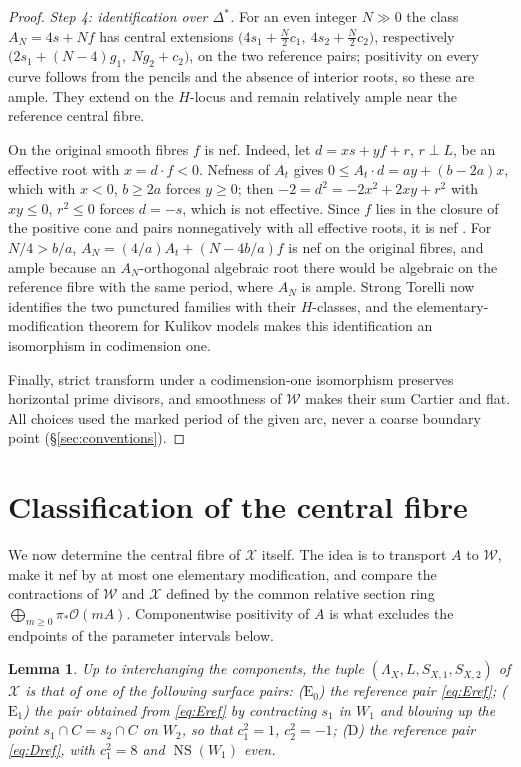 \documentclass[12pt]{article}
\newcommand{\NS}{\operatorname{NS}}
\newcommand{\calX}{\mathcal X}
\newcommand{\calW}{\mathcal W}
\newtheorem{lemma}[theorem]{Lemma}
\theoremstyle{definition}
\theoremstyle{remark}
\begin{document}
\begin{proof}
\emph{Step 4: identification over \(\Delta^*\).}
For an even integer \(N\gg0\) the class \(A_N=4s+Nf\) has central
extensions \(\bigl(4s_1+\tfrac N2c_1,\ 4s_2+\tfrac N2c_2\bigr)\),
respectively \(\bigl(2s_1+(N-4)g_1,\ Ng_2+c_2\bigr)\), on the two
reference pairs; positivity on every curve follows from the pencils
and the absence of interior roots, so these are ample. They extend on
the \(H\)-locus and remain relatively ample near the reference central
fibre.

On the original smooth fibres \(f\) is nef. Indeed, let
\(d=xs+yf+r\), \(r\perp L\), be an effective root with
\(x=d\cdot f<0\). Nefness of \(A_t\) gives
\(0\leq A_t\cdot d=ay+(b-2a)x\), which with \(x<0\), \(b\geq2a\)
forces \(y\geq0\); then \(-2=d^2=-2x^2+2xy+r^2\) with \(xy\leq0\),
\(r^2\leq0\) forces \(d=-s\), which is not effective. Since \(f\) lies
in the closure of the positive cone and pairs nonnegatively with all
effective roots, it is nef \cite[Ch.~8]{Hu}. For \(N/4>b/a\),
\(A_N=(4/a)A_t+(N-4b/a)f\) is nef on the original fibres, and ample
because an \(A_N\)-orthogonal algebraic root there would be algebraic
on the reference fibre with the same period, where \(A_N\) is ample.
Strong Torelli \cite[Theorem~2.3]{AE} now identifies the two punctured
families with their \(H\)-classes, and the elementary-modification
theorem for Kulikov models \cite[Corollary~3.1]{SB} makes this
identification an isomorphism in codimension one.

Finally, strict transform under a codimension-one isomorphism
preserves horizontal prime divisors, and smoothness of \(\calW\) makes
their sum Cartier and flat. All choices used the marked period of the
given arc, never a coarse boundary point (\S\ref{sec:conventions}).
\end{proof}

\section{Classification of the central fibre}\label{sec:models}

We now determine the central fibre of \(\calX\) itself. The idea is to
transport \(A\) to \(\calW\), make it nef by at most one elementary
modification, and compare the contractions of \(\calW\) and \(\calX\)
defined by the common relative section ring
\(\bigoplus_{m\ge0}\pi_*\mathcal O(mA)\). Componentwise positivity
of \(A\) is what excludes the endpoints of the parameter intervals
below.

\begin{lemma}\label{lem:models}
Up to interchanging the components, the tuple
\((\Lambda_X,L,S_{X,1},S_{X,2})\) of \(\calX\) is that of one of the
following surface pairs:
(\(\mathrm E_0\)) the reference pair \eqref{eq:Eref};
(\(\mathrm E_1\)) the pair obtained from \eqref{eq:Eref} by
contracting \(s_1\) in \(W_1\) and blowing up the point
\(s_1\cap C=s_2\cap C\) on \(W_2\), so that \(c_1^2=1\), \(c_2^2=-1\);
(\(\mathrm D\)) the reference pair \eqref{eq:Dref}, with
\(c_1^2=8\) and \(\NS(W_1)\) even.
\end{lemma}
\end{document}

